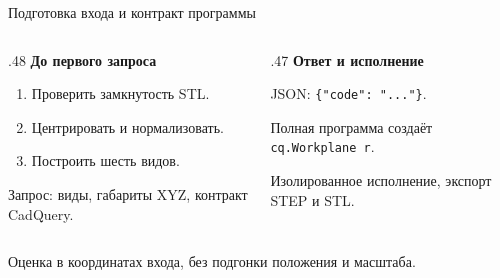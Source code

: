 \documentclass[aspectratio=169,11pt]{beamer}
\newcommand{\source}[1]{\par\vfill{\fontsize{7.2}{8.8}\selectfont\color{Muted}#1\par}}
\newcommand{\smalltext}{\fontsize{9.7}{12}\selectfont}
\begin{document}
\begin{frame}{Подготовка входа и контракт программы}\relax
\begin{columns}[T,onlytextwidth]
\begin{column}{.48\textwidth}
  \textbf{До первого запроса}
  \begin{enumerate}
    \item Проверить замкнутость STL.
    \item Центрировать и нормализовать.
    \item Построить шесть видов.
  \end{enumerate}
  \par\medskip
  {\smalltext Запрос: виды, габариты XYZ, контракт CadQuery.}
\end{column}
\begin{column}{.47\textwidth}
  \textbf{Ответ и исполнение}
  \par\medskip
  JSON: \texttt{\{"code": "..."\}}.
  \par\medskip
  Полная программа создаёт \texttt{cq.Workplane r}.
  \par\medskip
  Изолированное исполнение, экспорт STEP и STL.
\end{column}
\end{columns}
\source{Оценка в координатах входа, без подгонки положения и масштаба.}
\end{frame}
\end{document}
